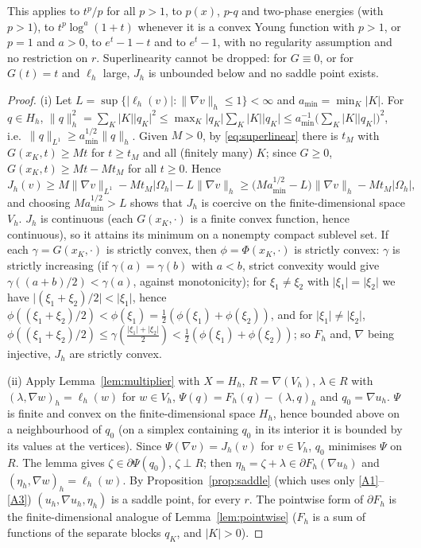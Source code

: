 \documentclass[11pt]{amsart}
\theoremstyle{definition}
\theoremstyle{remark}
\numberwithin{equation}{section}
\newcommand{\abs}[1]{\lvert #1\rvert}
\newcommand{\norm}[1]{\lVert #1\rVert}
\begin{document}
This applies to $t^p/p$ for all $p>1$, to $p(x)$, $p$-$q$ and two-phase energies (with $p>1$), to $t^p\log^a(1+t)$ whenever it is a convex Young function with $p>1$, or $p=1$ and $a>0$, to $e^t-1-t$ and to $e^t-1$, with no regularity assumption and no restriction on $r$. Superlinearity cannot be dropped: for $G\equiv0$, or for $G(t)=t$ and $\ell_h$ large, $J_h$ is unbounded below and no saddle point exists.

\begin{proof}
(i) Let $L=\sup\{\abs{\ell_h(v)}:\norm{\nabla v}_h\le1\}<\infty$ and $a_{\min}=\min_K\abs K$. For $q\in H_h$, $\norm q_h^2=\sum_K\abs K\abs{q_K}^2\le\max_K\abs{q_K}\sum_K\abs K\abs{q_K}\le a_{\min}^{-1}\big(\sum_K\abs K\abs{q_K}\big)^2$, i.e.\ $\norm q_{L^1}\ge a_{\min}^{1/2}\norm q_h$. Given $M>0$, by \eqref{eq:superlinear} there is $t_M$ with $G(x_K,t)\ge Mt$ for $t\ge t_M$ and all (finitely many) $K$; since $G\ge0$, $G(x_K,t)\ge Mt-Mt_M$ for all $t\ge0$. Hence
\[
J_h(v)\ge M\norm{\nabla v}_{L^1}-Mt_M\abs{\Omega_h}-L\norm{\nabla v}_h\ge\big(Ma_{\min}^{1/2}-L\big)\norm{\nabla v}_h-Mt_M\abs{\Omega_h},
\]
and choosing $M a_{\min}^{1/2}>L$ shows that $J_h$ is coercive on the finite-dimensional space $V_h$. $J_h$ is continuous (each $G(x_K,\cdot)$ is a finite convex function, hence continuous), so it attains its minimum on a nonempty compact sublevel set. If each $\gamma=G(x_K,\cdot)$ is strictly convex, then $\phi=\Phi(x_K,\cdot)$ is strictly convex: $\gamma$ is strictly increasing (if $\gamma(a)=\gamma(b)$ with $a<b$, strict convexity would give $\gamma((a+b)/2)<\gamma(a)$, against monotonicity); for $\xi_1\ne\xi_2$ with $\abs{\xi_1}=\abs{\xi_2}$ we have $\abs{(\xi_1+\xi_2)/2}<\abs{\xi_1}$, hence $\phi((\xi_1+\xi_2)/2)<\phi(\xi_1)=\frac12(\phi(\xi_1)+\phi(\xi_2))$, and for $\abs{\xi_1}\ne\abs{\xi_2}$, $\phi((\xi_1+\xi_2)/2)\le\gamma(\frac{\abs{\xi_1}+\abs{\xi_2}}2)<\frac12(\phi(\xi_1)+\phi(\xi_2))$; so $F_h$ and, $\nabla$ being injective, $J_h$ are strictly convex.

(ii) Apply Lemma~\ref{lem:multiplier} with $X=H_h$, $R=\nabla(V_h)$, $\lambda\in R$ with $(\lambda,\nabla w)_h=\ell_h(w)$ for $w\in V_h$, $\Psi(q)=F_h(q)-(\lambda,q)_h$ and $q_0=\nabla u_h$. $\Psi$ is finite and convex on the finite-dimensional space $H_h$, hence bounded above on a neighbourhood of $q_0$ (on a simplex containing $q_0$ in its interior it is bounded by its values at the vertices). Since $\Psi(\nabla v)=J_h(v)$ for $v\in V_h$, $q_0$ minimises $\Psi$ on $R$. The lemma gives $\zeta\in\partial\Psi(q_0)$, $\zeta\perp R$; then $\eta_h=\zeta+\lambda\in\partial F_h(\nabla u_h)$ and $(\eta_h,\nabla w)_h=\ell_h(w)$. By Proposition~\ref{prop:saddle} (which uses only \ref{A1}--\ref{A3}) $(u_h,\nabla u_h,\eta_h)$ is a saddle point, for every $r$. The pointwise form of $\partial F_h$ is the finite-dimensional analogue of Lemma~\ref{lem:pointwise} ($F_h$ is a sum of functions of the separate blocks $q_K$, and $\abs K>0$).


\end{proof}
\end{document}
